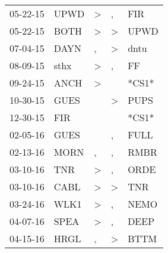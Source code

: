 \begin{supertabular}{p{0.07\textwidth}p{0.06\textwidth}p{0.02\textwidth}p{0.02\textwidth}p{0.06\textwidth}}
          05-22-15\textsuperscript{} &           UPWD\textsuperscript{} &     \textgreater &                , &            FIR\textsuperscript{} \\
          05-22-15\textsuperscript{} &           BOTH\textsuperscript{} &     \textgreater &     \textgreater &           UPWD\textsuperscript{} \\
          07-04-15\textsuperscript{} &           DAYN\textsuperscript{} &                , &     \textgreater &           dntu\textsuperscript{} \\
          08-09-15\textsuperscript{} &           sthx\textsuperscript{} &     \textgreater &                , &             FF\textsuperscript{} \\
          09-24-15\textsuperscript{} &           ANCH\textsuperscript{} &     \textgreater &                  &                            *CS1* \\
          10-30-15\textsuperscript{} &           GUES\textsuperscript{} &                  &     \textgreater &           PUPS\textsuperscript{} \\
          12-30-15\textsuperscript{} &            FIR\textsuperscript{} &                  &                  &                            *CS1* \\
          02-05-16\textsuperscript{} &           GUES\textsuperscript{} &                  &                , &           FULL\textsuperscript{} \\
          02-13-16\textsuperscript{} &           MORN\textsuperscript{} &                , &                , &           RMBR\textsuperscript{} \\
          03-10-16\textsuperscript{} &            TNR\textsuperscript{} &     \textgreater &                , &           ORDE\textsuperscript{} \\
          03-10-16\textsuperscript{} &           CABL\textsuperscript{} &     \textgreater &     \textgreater &            TNR\textsuperscript{} \\
          03-24-16\textsuperscript{} &           WLK1\textsuperscript{} &     \textgreater &                , &           NEMO\textsuperscript{} \\
          04-07-16\textsuperscript{} &           SPEA\textsuperscript{} &     \textgreater &                , &           DEEP\textsuperscript{} \\
          04-15-16\textsuperscript{} &           HRGL\textsuperscript{} &                , &     \textgreater &           BTTM\textsuperscript{} \\

\end{supertabular}
